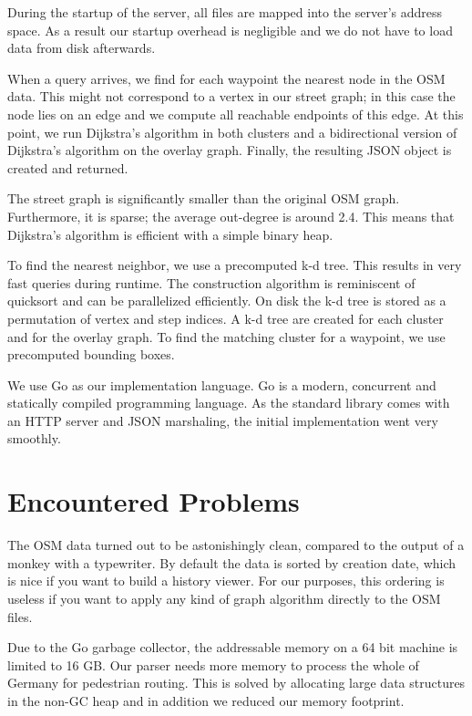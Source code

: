 \documentclass[a4paper]{article}
\begin{document}
During the startup of the server, all files are mapped into the server's address space.
As a result our startup overhead is negligible and we do not have to load data from disk afterwards.

When a query arrives, we find for each waypoint the nearest node in the OSM data.
This might not correspond to a vertex in our street graph;
in this case the node lies on an edge and we compute all reachable endpoints of this edge.
At this point, we run Dijkstra's algorithm in both clusters and
a bidirectional version of Dijkstra's algorithm on the overlay graph.
Finally, the resulting JSON object is created and returned.

The street graph is significantly smaller than the original OSM graph.
Furthermore, it is sparse; the average out-degree is around 2.4.
This means that Dijkstra's algorithm is efficient with a simple binary heap.

To find the nearest neighbor, we use a precomputed k-d tree.
This results in very fast queries during runtime.
The construction algorithm is reminiscent of quicksort and can be parallelized efficiently.
On disk the k-d tree is stored as a permutation of vertex and step indices.
A k-d tree are created for each cluster and for the overlay graph.
To find the matching cluster for a waypoint, we use precomputed bounding boxes.

We use Go as our implementation language.
Go is a modern, concurrent and statically compiled programming language.
As the standard library comes with an HTTP server and JSON marshaling,
the initial implementation went very smoothly.

\section{Encountered Problems}

The OSM data turned out to be astonishingly clean, compared to the output of a monkey with a typewriter.
By default the data is sorted by creation date, which is nice if you want to build a history viewer.
For our purposes, this ordering is useless if you want to apply any kind of graph algorithm
directly to the OSM files.


Due to the Go garbage collector, the addressable memory on a 64 bit machine is limited to 16 GB.
Our parser needs more memory to process the whole of Germany for pedestrian routing.
This is solved by allocating large data structures in the non-GC heap
and in addition we reduced our memory footprint.
\end{document}
